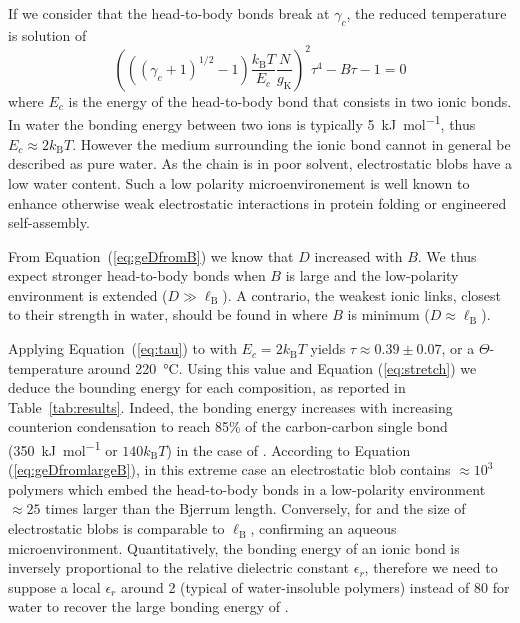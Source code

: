 \documentclass[journal=jacsat,manuscript=article]{achemso}
\begin{document}
If we consider that the head-to-body bonds break at $\gamma_c$, the reduced temperature is solution of
\begin{equation}
\left(\left((\gamma_c +1)^{1/2} -1\right)\frac{k_\mathrm{B}T}{E_c}\frac{N}{g_\mathrm{K}}\right)^2 \tau^4 - B\tau -1 = 0
\label{eq:tau}
\end{equation}
where $E_c$ is the energy of the head-to-body bond that consists in two ionic bonds. In water the bonding energy between two ions is typically \SI{5}{\kilo\joule\per\mole}\cite{Schneider1992}, thus $E_c\approx 2 k_\mathrm{B}T$. However the medium surrounding the ionic bond cannot in general be described as pure water. As the chain is in poor solvent, electrostatic blobs have a low water content. Such a low polarity microenvironement is well known to enhance otherwise weak electrostatic interactions in protein folding or engineered self-assembly\cite{Rehm2010}.

From Equation~(\ref{eq:geDfromB}) we know that $D$ increased with $B$. We thus expect stronger head-to-body bonds when $B$ is large and the low-polarity environment is extended ($D\gg\ell_\mathrm{B}$). A contrario, the weakest ionic links, closest to their strength in water, should be found in  where $B$ is minimum ($D\approx\ell_\mathrm{B}$).

Applying Equation~(\ref{eq:tau}) to  with $E_c = 2 k_\mathrm{B}T$ yields $\tau \approx 0.39\pm 0.07$, or a $\Theta$-temperature around \SI{220}{\celsius}. Using this value and Equation (\ref{eq:stretch}) we deduce the bounding energy for each composition, as reported in Table~\ref{tab:results}. Indeed, the bonding energy increases with increasing counterion condensation to reach 85\% of the carbon-carbon single bond (\SI{350}{\kilo\joule\per\mole} or $140 k_\mathrm{B}T$) in the case of . According to Equation (\ref{eq:geDfromlargeB}), in this extreme case an electrostatic blob contains $\approx 10^3$ polymers which embed the head-to-body bonds in a low-polarity environment $\approx 25$ times larger than the Bjerrum length. Conversely, for  and  the size of electrostatic blobs is comparable to $\ell_\mathrm{B}$, confirming an aqueous microenvironment. Quantitatively, the bonding energy of an ionic bond is inversely proportional to the relative dielectric constant $\epsilon_r$, therefore we need to suppose a local $\epsilon_r$ around 2 (typical of water-insoluble polymers) instead of 80 for water to recover the large bonding energy of .
\end{document}
